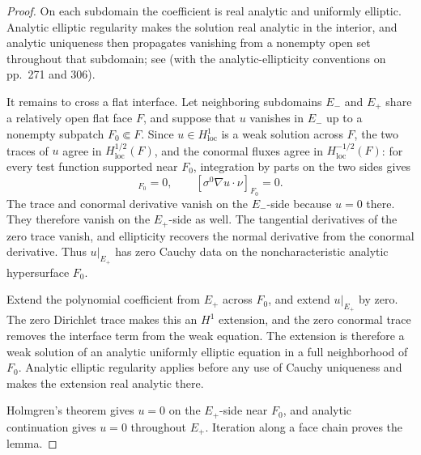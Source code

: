 \documentclass[10pt,a4paper]{amsart}
\begin{document}
\begin{proof}
On each subdomain the coefficient is real analytic and uniformly elliptic.
Analytic elliptic regularity makes the solution real analytic in the interior,
and analytic uniqueness then propagates vanishing from a nonempty open set
throughout that subdomain; see
\cite[Theorem 8.6.5, p.~309]{Hormander1983} (with the analytic-ellipticity
conventions on pp.~271 and 306).

It remains to cross a flat interface.  Let neighboring
subdomains \(E_-\) and \(E_+\) share a relatively open flat face \(F\), and
suppose that \(u\) vanishes in \(E_-\) up to a nonempty subpatch
\(F_0\Subset F\).  Since \(u\in H^1_{\mathrm{loc}}\) is a weak solution across
\(F\), the two traces of \(u\) agree in \(H^{1/2}_{\mathrm{loc}}(F)\), and the
conormal fluxes agree in \(H^{-1/2}_{\mathrm{loc}}(F)\): for every test function
supported near \(F_0\), integration by parts on the two sides gives
\begin{equation}
  [u]_{F_0}=0,
  \qquad
  [\sigma^0\nabla u\cdot\nu]_{F_0}=0 .
  \label{eq:transmission-traces-ucp}
\end{equation}
The trace and conormal derivative vanish on the \(E_-\)-side because \(u=0\)
there.  They therefore vanish on the \(E_+\)-side as well.  The tangential
derivatives of the zero trace vanish, and ellipticity recovers the normal
derivative from the conormal derivative.  Thus \(u|_{E_+}\) has zero Cauchy
data on the noncharacteristic analytic hypersurface \(F_0\).

Extend the polynomial coefficient from \(E_+\) across \(F_0\), and extend
\(u|_{E_+}\) by zero.  The zero Dirichlet trace makes this an \(H^1\) extension,
and the zero conormal trace removes the interface term from the weak equation.
The extension is therefore a weak solution of an analytic uniformly elliptic
equation in a full neighborhood of \(F_0\).  Analytic elliptic regularity
applies before any use of Cauchy uniqueness and makes the extension real
analytic there.

Holmgren's theorem \cite{John1982} gives \(u=0\) on the \(E_+\)-side near
\(F_0\), and analytic continuation gives \(u=0\) throughout \(E_+\).  Iteration
along a face chain proves the lemma.
\end{proof}
\end{document}
